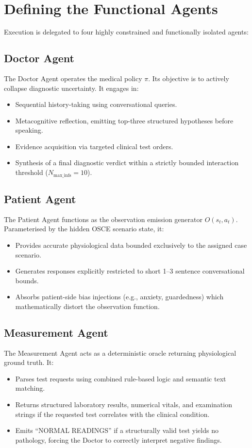 \section{Defining the Functional Agents}

Execution is delegated to four highly constrained and functionally isolated agents:

\subsection{Doctor Agent}
The Doctor Agent operates the medical policy $\pi$. Its objective is to actively collapse diagnostic uncertainty. It engages in:
\begin{itemize}
    \item Sequential history-taking using conversational queries.
    \item Metacognitive reflection, emitting top-three structured hypotheses before speaking.
    \item Evidence acquisition via targeted clinical test orders.
    \item Synthesis of a final diagnostic verdict within a strictly bounded interaction threshold ($N_{\text{max\_infs}} = 10$).
\end{itemize}

\subsection{Patient Agent}
The Patient Agent functions as the observation emission generator $O(s_t, a_t)$. Parameterised by the hidden OSCE scenario state, it:
\begin{itemize}
    \item Provides accurate physiological data bounded exclusively to the assigned case scenario.
    \item Generates responses explicitly restricted to short 1--3 sentence conversational bounds.
    \item Absorbs patient-side bias injections (e.g., anxiety, guardedness) which mathematically distort the observation function.
\end{itemize}

\subsection{Measurement Agent}
The Measurement Agent acts as a deterministic oracle returning physiological ground truth. It:
\begin{itemize}
    \item Parses test requests using combined rule-based logic and semantic text matching.
    \item Returns structured laboratory results, numerical vitals, and examination strings if the requested test correlates with the clinical condition.
    \item Emits ``NORMAL READINGS'' if a structurally valid test yields no pathology, forcing the Doctor to correctly interpret negative findings.
\end{itemize}

